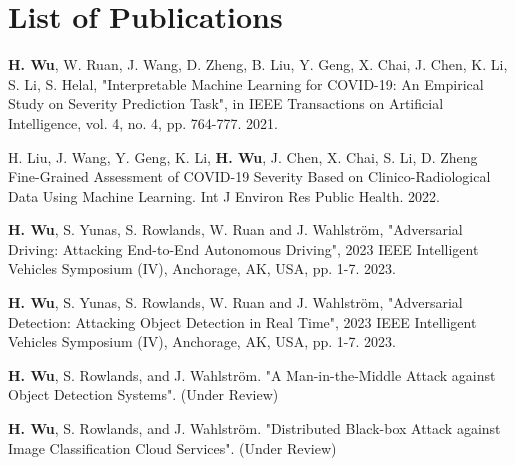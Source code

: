 \chapter*{List of Publications}

\noindent \textbf{H. Wu}, W. Ruan, J. Wang, D. Zheng, B. Liu, Y. Geng, X. Chai, J. Chen, K. Li, S. Li, S. Helal, "Interpretable Machine Learning for COVID-19: An Empirical Study on Severity Prediction Task", in IEEE Transactions on Artificial Intelligence, vol. 4, no. 4, pp. 764-777. 2021.

\vspace{4pt}

\noindent
H. Liu, J. Wang, Y. Geng, K. Li, \textbf{H. Wu}, J. Chen, X. Chai, S. Li, D. Zheng Fine-Grained Assessment of COVID-19 Severity Based on Clinico-Radiological Data Using Machine Learning. Int J Environ Res Public Health. 2022.

\vspace{4pt}

\noindent
\textbf{H. Wu}, S. Yunas, S. Rowlands, W. Ruan and J. Wahlström, "Adversarial Driving: Attacking End-to-End Autonomous Driving", 2023 IEEE Intelligent Vehicles Symposium (IV), Anchorage, AK, USA, pp. 1-7. 2023.

\vspace{4pt}

\noindent
\textbf{H. Wu}, S. Yunas, S. Rowlands, W. Ruan and J. Wahlström, "Adversarial Detection: Attacking Object Detection in Real Time", 2023 IEEE Intelligent Vehicles Symposium (IV), Anchorage, AK, USA, pp. 1-7. 2023.

\vspace{4pt}

\noindent
\textbf{H. Wu}, S. Rowlands, and J. Wahlström. "A Man-in-the-Middle Attack against Object Detection Systems". (Under Review)

\vspace{4pt}

\noindent
\textbf{H. Wu}, S. Rowlands, and J. Wahlström. "Distributed Black-box Attack against Image Classification Cloud Services". (Under Review)


